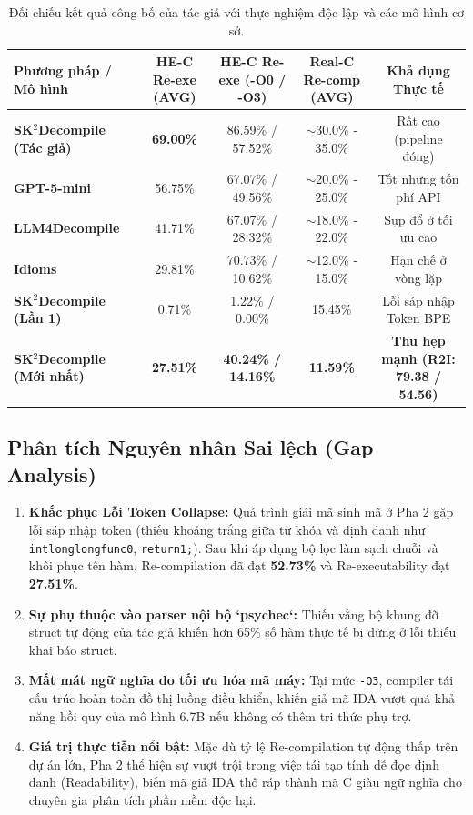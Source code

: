 \documentclass[11pt,a4paper]{article}
\begin{document}
\begin{table}[h]
\centering
\caption{Đối chiếu kết quả công bố của tác giả với thực nghiệm độc lập và các mô hình cơ sở.}
\label{tab:side_by_side}
\begin{tabularx}{\textwidth}{lcccc}
\toprule
\textbf{Phương pháp / Mô hình} & \textbf{HE-C Re-exe (AVG)} & \textbf{HE-C Re-exe (-O0 / -O3)} & \textbf{Real-C Re-comp (AVG)} & \textbf{Khả dụng Thực tế} \\
\midrule
\textbf{SK$^2$Decompile (Tác giả)} & \textbf{69.00\%} & 86.59\% / 57.52\% & $\sim$30.0\% - 35.0\% & Rất cao (pipeline đóng) \\
\textbf{GPT-5-mini}                & 56.75\%          & 67.07\% / 49.56\% & $\sim$20.0\% - 25.0\% & Tốt nhưng tốn phí API \\
\textbf{LLM4Decompile}             & 41.71\%          & 67.07\% / 28.32\% & $\sim$18.0\% - 22.0\% & Sụp đổ ở tối ưu cao \\
\textbf{Idioms}                    & 29.81\%          & 70.73\% / 10.62\% & $\sim$12.0\% - 15.0\% & Hạn chế ở vòng lặp \\
\midrule
\textbf{SK$^2$Decompile (Lần 1)}   & 0.71\%           & 1.22\% / 0.00\%   & 15.45\%               & Lỗi sáp nhập Token BPE \\
\textbf{SK$^2$Decompile (Mới nhất)}& \textbf{27.51\%} & \textbf{40.24\% / 14.16\%} & \textbf{11.59\%}      & \textbf{Thu hẹp mạnh (R2I: 79.38 / 54.56)} \\
\bottomrule
\end{tabularx}
\end{table}

\subsection{Phân tích Nguyên nhân Sai lệch (Gap Analysis)}
\begin{enumerate}
    \item \textbf{Khắc phục Lỗi Token Collapse:} Quá trình giải mã sinh mã ở Pha 2 gặp lỗi sáp nhập token (thiếu khoảng trắng giữa từ khóa và định danh như \texttt{intlonglongfunc0}, \texttt{return1;}). Sau khi áp dụng bộ lọc làm sạch chuỗi và khôi phục tên hàm, Re-compilation đã đạt \textbf{52.73\%} và Re-executability đạt \textbf{27.51\%}.
    \item \textbf{Sự phụ thuộc vào parser nội bộ `psychec`:} Thiếu vắng bộ khung đỡ struct tự động của tác giả khiến hơn 65\% số hàm thực tế bị dừng ở lỗi thiếu khai báo struct.
    \item \textbf{Mất mát ngữ nghĩa do tối ưu hóa mã máy:} Tại mức \texttt{-O3}, compiler tái cấu trúc hoàn toàn đồ thị luồng điều khiển, khiến giả mã IDA vượt quá khả năng hồi quy của mô hình 6.7B nếu không có thêm tri thức phụ trợ.
    \item \textbf{Giá trị thực tiễn nổi bật:} Mặc dù tỷ lệ Re-compilation tự động thấp trên dự án lớn, Pha 2 thể hiện sự vượt trội trong việc tái tạo tính dễ đọc định danh (Readability), biến mã giả IDA thô ráp thành mã C giàu ngữ nghĩa cho chuyên gia phân tích phần mềm độc hại.
\end{enumerate}
\end{document}
